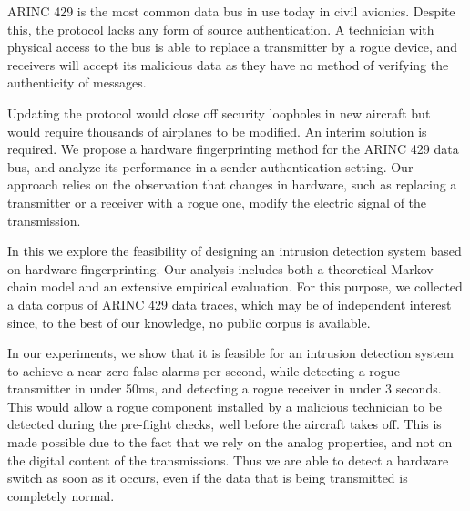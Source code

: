 ARINC 429 is the most common data bus in use today in civil avionics.
Despite this, the protocol lacks any form of source authentication.
A technician with physical access to the bus is able to replace a transmitter by a rogue device, and receivers will accept its malicious data as they have no method of verifying the authenticity of messages.

Updating the protocol would close off security loopholes in new aircraft but would require thousands of airplanes to be modified.
An interim solution is required.
We propose a hardware fingerprinting method for the ARINC 429 data bus, and analyze its performance in a sender authentication setting.
Our approach relies on the observation that changes in hardware, such as replacing a transmitter or a receiver with a rogue one, modify the electric signal of the transmission. 

In this \iftoggle{paper} {paper} {work} we explore the feasibility of designing an intrusion detection system based on hardware fingerprinting.
Our analysis includes both a theoretical Markov-chain model and an extensive empirical evaluation.
For this purpose, we collected a data corpus of ARINC 429 data traces, which may be of independent interest since, to the best of our knowledge, no public corpus is available.

In our experiments, we show that it is feasible for an intrusion detection system to achieve a near-zero false alarms per second, while detecting a rogue transmitter in under 50ms, and detecting a rogue receiver in under 3 seconds.
This would allow a rogue component installed by a malicious technician to be detected during the pre-flight checks, well before the aircraft takes off.
This is made possible due to the fact that we rely on the analog properties, and not on the digital content of the transmissions.
Thus we are able to detect a hardware switch as soon as it occurs, even if the data that is being transmitted is completely normal.
